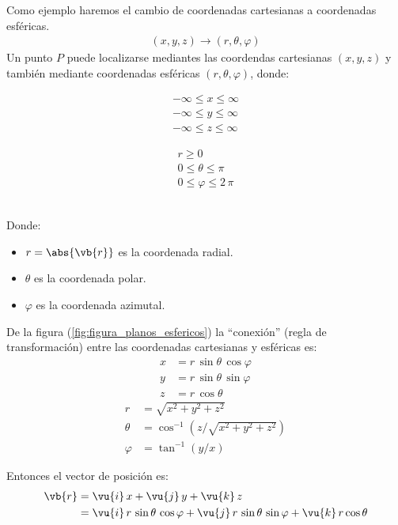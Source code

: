 Como ejemplo haremos el cambio de coordenadas cartesianas a coordenadas esféricas.
\begin{align*}
(x, y, z) \longrightarrow (r, \theta, \varphi)
\end{align*}
Un punto $P$ puede localizarse mediantes las coordendas cartesianas $(x, y, z)$ y también mediante coordenadas esféricas $(r, \theta, \varphi)$, donde:
\\[0.5em]
\begin{minipage}{0.4\linewidth}
\begin{align*}
-\infty \le x \le \infty \\
-\infty \le y \le \infty \\
-\infty \le z \le \infty
\end{align*}
\end{minipage}
\hspace{2cm}
\begin{minipage}{0.4\linewidth}
\begin{align*}
r \geq 0 \\
0 \le \theta \le \pi \\
0 \le \varphi \le 2 \, \pi
\end{align*}
\end{minipage}
\\[0.5em]
Donde:
\begin{itemize}
\item $r = \abs{\vb{r}}$ es la coordenada radial.
\item $\theta$ es la coordenada polar.
\item $\varphi$ es la coordenada azimutal.
\end{itemize}

De la figura (\ref{fig:figura_planos_esfericos}) la \enquote{conexión} (regla de transformación)  entre las coordenadas cartesianas y esféricas es:
\begin{align*}
x &= r \, \sin \theta \, \cos \varphi \\
y &= r \, \sin \theta \, \sin \varphi \\
z &= r \, \cos \theta
\end{align*}
\begin{align*}
r &= \sqrt{x^{2} + y^{2} + z^{2}} \\
\theta &= \cos^{-1} \left( z / \sqrt{x^{2} + y^{2} + z^{2}} \right) \\
\varphi &= \tan^{-1} (y/x)
\end{align*}

Entonces el vector de posición es:
\begin{align}
\begin{aligned}
\vb{r} &= \vu{i} \, x + \vu{j} \, y + \vu{k} \, z \\
&= \vu{i} \, r \, \sin \theta \, \cos \varphi + \vu{j} \, r \, \sin \theta \, \sin \varphi + \vu{k} \, r \cos \theta 
\end{aligned}
\label{eq:ecuacion_01_06}
\end{align}


